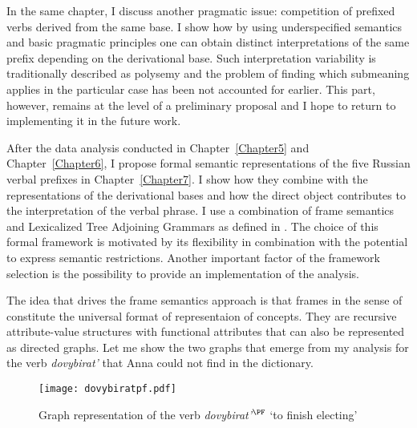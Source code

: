 In the same chapter, I discuss another pragmatic issue: competition of prefixed verbs derived from the same base. I show how by using underspecified semantics and basic pragmatic principles one can obtain distinct interpretations of the same prefix depending on the derivational base. Such interpretation variability is traditionally described as polysemy and the problem of finding which submeaning applies in the particular case has been not accounted for earlier. This part, however, remains at the level of a preliminary proposal and I hope to return to implementing it in the future work.

After the data analysis conducted in Chapter~\ref{Chapter5} and Chapter~\ref{Chapter6}, I propose formal semantic representations of the five Russian verbal prefixes in Chapter~\ref{Chapter7}. I show how they combine with the representations of the derivational bases and how the direct object contributes to the interpretation of the verbal phrase. I use a combination of frame semantics and Lexicalized Tree Adjoining Grammars as defined in \citealt{KallmeyerOsswald:13}. The choice of this formal framework is motivated by its flexibility in combination with the potential to express semantic restrictions. Another important factor of the framework selection is the possibility to provide an implementation of the analysis. 

The idea that drives the frame semantics approach \citep{Loebner:2014} is that frames in the sense of \citet{Barsalou:92} constitute the universal format of representaion of concepts. They are recursive attribute-value structures with functional attributes that can also be represented as directed graphs. Let me show the two graphs that emerge from my analysis for the verb \textit{dovybirat'} that Anna could not find in the dictionary.

\begin{figure}
\texttt{[image: dovybiratpf.pdf]}
\caption{Graph representation of the verb \textit{dovybirat'}$^{\PF}$ `to finish electing'}
\label{graph:pf}
\end{figure}

